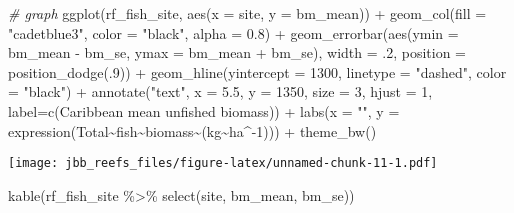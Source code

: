 \documentclass[
]{article}
\newenvironment{Shaded}{\begin{snugshade}}{\end{snugshade}}
\newcommand{\AttributeTok}[1]{\textcolor[rgb]{0.77,0.63,0.00}{#1}}
\newcommand{\CommentTok}[1]{\textcolor[rgb]{0.56,0.35,0.01}{\textit{#1}}}
\newcommand{\DecValTok}[1]{\textcolor[rgb]{0.00,0.00,0.81}{#1}}
\newcommand{\FloatTok}[1]{\textcolor[rgb]{0.00,0.00,0.81}{#1}}
\newcommand{\FunctionTok}[1]{\textcolor[rgb]{0.00,0.00,0.00}{#1}}
\newcommand{\NormalTok}[1]{#1}
\newcommand{\SpecialCharTok}[1]{\textcolor[rgb]{0.00,0.00,0.00}{#1}}
\newcommand{\StringTok}[1]{\textcolor[rgb]{0.31,0.60,0.02}{#1}}
\begin{document}
\begin{Shaded}
\begin{Highlighting}[]
\CommentTok{\# graph}
\FunctionTok{ggplot}\NormalTok{(rf\_fish\_site, }\FunctionTok{aes}\NormalTok{(}\AttributeTok{x =}\NormalTok{ site, }\AttributeTok{y =}\NormalTok{ bm\_mean)) }\SpecialCharTok{+}
  \FunctionTok{geom\_col}\NormalTok{(}\AttributeTok{fill =} \StringTok{"cadetblue3"}\NormalTok{, }\AttributeTok{color =} \StringTok{"black"}\NormalTok{, }\AttributeTok{alpha =} \FloatTok{0.8}\NormalTok{) }\SpecialCharTok{+}
  \FunctionTok{geom\_errorbar}\NormalTok{(}\FunctionTok{aes}\NormalTok{(}\AttributeTok{ymin =}\NormalTok{ bm\_mean }\SpecialCharTok{{-}}\NormalTok{ bm\_se, }\AttributeTok{ymax =}\NormalTok{ bm\_mean }\SpecialCharTok{+}\NormalTok{ bm\_se), }\AttributeTok{width =}\NormalTok{ .}\DecValTok{2}\NormalTok{,}
                 \AttributeTok{position =} \FunctionTok{position\_dodge}\NormalTok{(.}\DecValTok{9}\NormalTok{)) }\SpecialCharTok{+}
  \FunctionTok{geom\_hline}\NormalTok{(}\AttributeTok{yintercept =} \DecValTok{1300}\NormalTok{, }\AttributeTok{linetype =} \StringTok{"dashed"}\NormalTok{, }\AttributeTok{color =} \StringTok{"black"}\NormalTok{) }\SpecialCharTok{+}
  \FunctionTok{annotate}\NormalTok{(}\StringTok{"text"}\NormalTok{, }\AttributeTok{x =} \FloatTok{5.5}\NormalTok{, }\AttributeTok{y =} \DecValTok{1350}\NormalTok{, }\AttributeTok{size =} \DecValTok{3}\NormalTok{, }\AttributeTok{hjust =} \DecValTok{1}\NormalTok{, }\AttributeTok{label=}\FunctionTok{c}\NormalTok{(}\StringTok{\textquotesingle{}Caribbean mean unfished biomass\textquotesingle{}}\NormalTok{)) }\SpecialCharTok{+}
  \FunctionTok{labs}\NormalTok{(}\AttributeTok{x =} \StringTok{""}\NormalTok{, }\AttributeTok{y =} \FunctionTok{expression}\NormalTok{(Total}\SpecialCharTok{\textasciitilde{}}\NormalTok{fish}\SpecialCharTok{\textasciitilde{}}\NormalTok{biomass}\SpecialCharTok{\textasciitilde{}}\NormalTok{(kg}\SpecialCharTok{\textasciitilde{}}\NormalTok{ha}\SpecialCharTok{\^{}{-}}\DecValTok{1}\NormalTok{))) }\SpecialCharTok{+}
  \FunctionTok{theme\_bw}\NormalTok{()}
\end{Highlighting}
\end{Shaded}

\texttt{[image: jbb\_reefs\_files/figure-latex/unnamed-chunk-11-1.pdf]}

\begin{Shaded}
\begin{Highlighting}[]
\FunctionTok{kable}\NormalTok{(rf\_fish\_site }\SpecialCharTok{\%\textgreater{}\%} \FunctionTok{select}\NormalTok{(site, bm\_mean, bm\_se))}
\end{Highlighting}
\end{Shaded}
\end{document}
